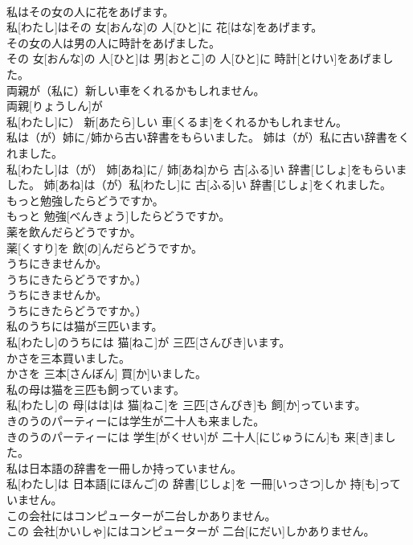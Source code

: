 \documentclass[8pt]{extreport}
\begin{document}
\begin{CJK}{UTF8}{min}
\\	私はその女の人に花をあげます。	
\\	私[わたし]はその 女[おんな]の 人[ひと]に 花[はな]をあげます。	
\\	その女の人は男の人に時計をあげました。	
\\	その 女[おんな]の 人[ひと]は 男[おとこ]の 人[ひと]に 時計[とけい]をあげました。	
\\	両親が（私に）新しい車をくれるかもしれません。	
\\	両親[りょうしん]が
\\	私[わたし]に） 新[あたら]しい 車[くるま]をくれるかもしれません。	
\\	私は（が）姉に/姉から古い辞書をもらいました。 姉は（が）私に古い辞書をくれました。	
\\	私[わたし]は（が） 姉[あね]に/ 姉[あね]から 古[ふる]い 辞書[じしょ]をもらいました。 姉[あね]は（が）私[わたし]に 古[ふる]い 辞書[じしょ]をくれました。	
\\	もっと勉強したらどうですか。	
\\	もっと 勉強[べんきょう]したらどうですか。	
\\	薬を飲んだらどうですか。	
\\	薬[くすり]を 飲[の]んだらどうですか。	
\\	うちにきませんか。
\\	うちにきたらどうですか。）	
\\	うちにきませんか。
\\	うちにきたらどうですか。）	
\\	私のうちには猫が三匹います。	
\\	私[わたし]のうちには 猫[ねこ]が 三匹[さんびき]います。	
\\	かさを三本買いました。	
\\	かさを 三本[さんぼん] 買[か]いました。	
\\	私の母は猫を三匹も飼っています。	
\\	私[わたし]の 母[はは]は 猫[ねこ]を 三匹[さんびき]も 飼[か]っています。	
\\	きのうのパーティーには学生が二十人も来ました。	
\\	きのうのパーティーには 学生[がくせい]が 二十人[にじゅうにん]も 来[き]ました。	
\\	私は日本語の辞書を一冊しか持っていません。	
\\	私[わたし]は 日本語[にほんご]の 辞書[じしょ]を 一冊[いっさつ]しか 持[も]っていません。	
\\	この会社にはコンピューターが二台しかありません。	
\\	この 会社[かいしゃ]にはコンピューターが 二台[にだい]しかありません。	

\end{CJK}
\end{document}
